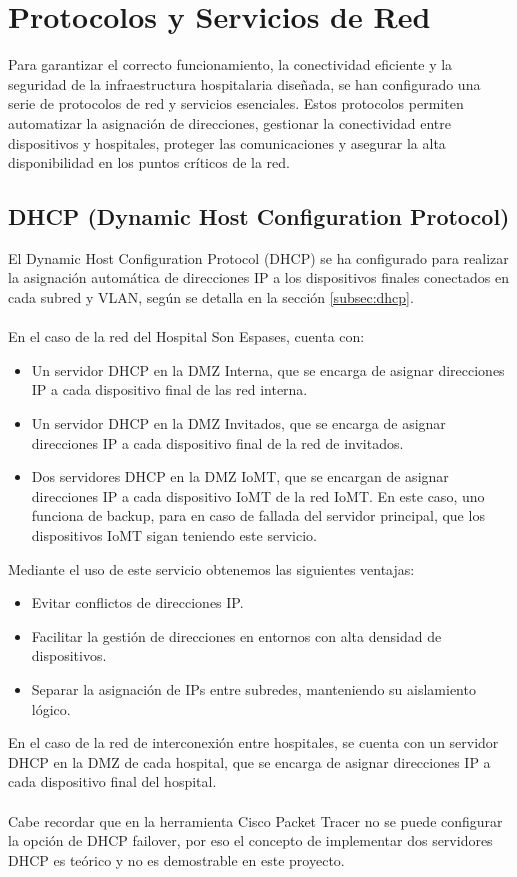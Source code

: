 \section{Protocolos y Servicios de Red}
Para garantizar el correcto funcionamiento, la conectividad eficiente y la seguridad de la infraestructura hospitalaria diseñada, se han configurado una serie de protocolos 
de red y servicios esenciales. Estos protocolos permiten automatizar la asignación de direcciones, gestionar la conectividad entre dispositivos y hospitales, proteger las 
comunicaciones y asegurar la alta disponibilidad en los puntos críticos de la red.

\subsection{DHCP (Dynamic Host Configuration Protocol)}
El Dynamic Host Configuration Protocol (DHCP) se ha configurado para realizar la asignación automática de direcciones IP a los dispositivos finales conectados en cada subred y VLAN, según se detalla en la sección \ref{subsec:dhcp}.
\\ \\
En el caso de la red del Hospital Son Espases, cuenta con:
\begin{itemize}
    \item Un servidor DHCP en la DMZ Interna, que se encarga de asignar direcciones IP a cada dispositivo final de las red interna.
    \item Un servidor DHCP en la DMZ Invitados, que se encarga de asignar direcciones IP a cada dispositivo final de la red de invitados.
    \item Dos servidores DHCP en la DMZ IoMT, que se encargan de asignar direcciones IP a cada dispositivo IoMT de la red IoMT. En este caso, uno funciona de backup, para en caso de fallada del servidor principal, que los dispositivos IoMT sigan teniendo este servicio.
\end{itemize}
Mediante el uso de este servicio obtenemos las siguientes ventajas:
\begin{itemize}
    \item Evitar conflictos de direcciones IP.
    \item Facilitar la gestión de direcciones en entornos con alta densidad de dispositivos.
    \item Separar la asignación de IPs entre subredes, manteniendo su aislamiento lógico.
\end{itemize}
En el caso de la red de interconexión entre hospitales, se cuenta con un servidor DHCP en la DMZ de cada hospital, que se encarga de asignar direcciones IP a cada dispositivo final del hospital. \\ \\
Cabe recordar que en la herramienta Cisco Packet Tracer no se puede configurar la opción de DHCP failover, por eso el concepto de implementar dos servidores DHCP es teórico y no es demostrable en este proyecto.

